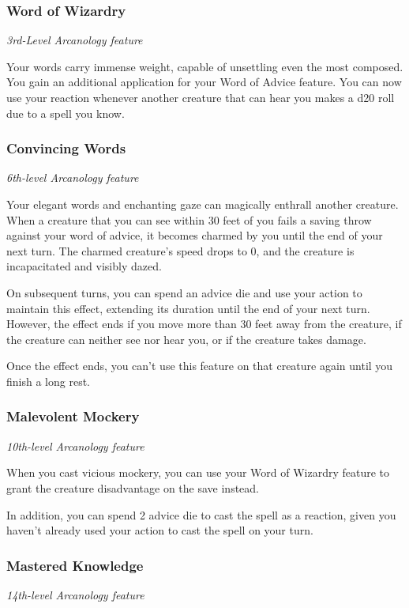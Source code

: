 \documentclass[letterpaper,openany,twoside,twocolumn]{book}
\begin{document}
	\eject
	
	\subsubsection*{Word of Wizardry}
	\textnormal{\textit{3rd-Level Arcanology feature}}
	
	Your words carry immense weight, capable of unsettling even the most composed. You gain an additional application for your Word of Advice feature. You can now use your reaction whenever another creature that can hear you makes a d20 roll due to a spell you know.
	
	\subsubsection*{Convincing Words}
	\textnormal{\textit{6th-level Arcanology feature}}
	
	Your elegant words and enchanting gaze can magically enthrall another creature. When a creature that you can see within 30 feet of you fails a saving throw against your word of advice, it becomes charmed by you until the end of your next turn. The charmed creature's speed drops to 0, and the creature is incapacitated and visibly dazed.
	
	On subsequent turns, you can spend an advice die and use your action to maintain this effect, extending its duration until the end of your next turn. However, the effect ends if you move more than 30 feet away from the creature, if the creature can neither see nor hear you, or if the creature takes damage.
	
	Once the effect ends, you can't use this feature on that creature again until you finish a long rest.
	
	\subsubsection*{Malevolent Mockery}
	\textnormal{\textit{10th-level Arcanology feature}}
	
	When you cast vicious mockery, you can use your Word of Wizardry feature to grant the creature disadvantage on the save instead.
	
	In addition, you can spend 2 advice die to cast the spell as a reaction, given you haven't already used your action to cast the spell on your turn.
	
	\subsubsection*{Mastered Knowledge}
	\textnormal{\textit{14th-level Arcanology feature}}
	
\end{document}
